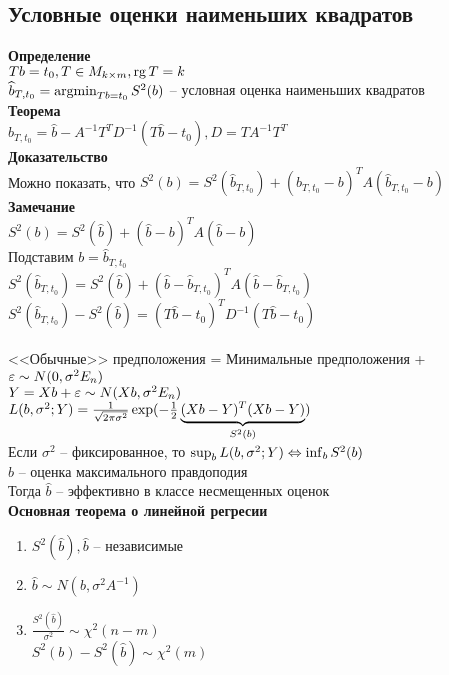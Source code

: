 \documentclass[12pt]{article}
\begin{document}
\subsection{Условные оценки наименьших квадратов}
\textbf{Определение}\\
$Tb = t_0, T \in M_{k \times m}, \rg T = k$\\
$\widehat b_{T, t_0} = \argmin_{Tb = t_0} S^2(b)$ -- условная оценка наименьших квадратов\\
\textbf{Теорема}\\
$\widehat b_{T, t_0} = \widehat b - A^{-1} T^T D^{-1}(T\widehat b - t_0), D = TA^{-1}T^T$\\
\textbf{Доказательство}\\
Можно показать, что $S^2(b) = S^2(\widehat b_{T, t_0}) + (\widehat b_{T, t_0} - b)^TA(\widehat b_{T, t_0} - b)$\\
\textbf{Замечание}\\
$S^2(b) = S^2(\widehat{ b}) + (\widehat{ b} - b)^T A (\widehat{ b} - b)$\\
Подставим $b = \widehat b_{T, t_0}$\\
$S^2(\widehat b_{T, t_0}) = S^2(\widehat{ b}) + (\widehat{ b} - \widehat b_{T, t_0})^TA(\widehat{ b} - \widehat b_{T, t_0})$\\
$S^2(\widehat b_{T, t_0}) - S^2(\widehat{ b}) = (T\widehat{ b} - t_0)^TD^{-1}(T\widehat{ b} - t_0)$\\\\
<<Обычные>> предположения = Минимальные предположения + $\eps \sim N(0, \sigma^2 E_n)$\\
$Y = Xb + \eps \sim N(Xb, \sigma^2 E_n)$\\
$L(b, \sigma^2; Y) = \frac1{\sqrt{2\pi \sigma^2}} \exp(-\frac12 \ub{S^2(b)}{(Xb-Y)^T (Xb - Y)})$\\
Если $\sigma^2$ -- фиксированное, то $\sup_{b} L(b, \sigma^2; Y) \LRto \inf_b S^2(b)$\\
$\widehat{b}$ -- оценка максимального правдоподия\\
Тогда $\widehat b$ -- эффективно в классе несмещенных оценок\\
\textbf{Основная теорема о линейной регресии}\\
\begin{enumerate}
	\item $S^2(\widehat{b}), \widehat{b}$ -- независимые
	\item $\widehat b \sim N(b, \sigma^2 A^{-1})$
	\item $\frac{S^2(\widehat{b})}{\sigma^2}\sim \chi^2(n-m)$\\
	$S^2(b) - S^2(\widehat b) \sim \chi^2(m)$
\end{enumerate}
\end{document}
